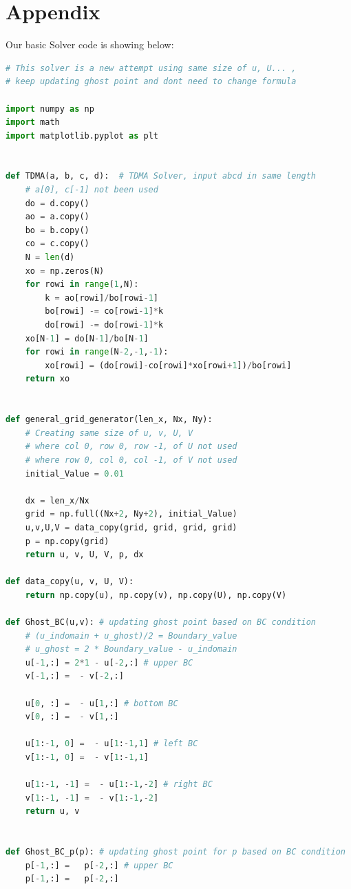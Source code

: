 \documentclass[12pt]{article}
\begin{document}
\section*{Appendix}
\begin{scriptsize}

Our basic Solver code is showing below:
\begin{lstlisting}[language=python,caption={Lid Driven Cavity Solver}]
# This solver is a new attempt using same size of u, U... , 
# keep updating ghost point and dont need to change formula

import numpy as np
import math
import matplotlib.pyplot as plt


def TDMA(a, b, c, d):  # TDMA Solver, input abcd in same length
    # a[0], c[-1] not been used
    do = d.copy()
    ao = a.copy()
    bo = b.copy()
    co = c.copy()
    N = len(d)
    xo = np.zeros(N)
    for rowi in range(1,N):
        k = ao[rowi]/bo[rowi-1]
        bo[rowi] -= co[rowi-1]*k
        do[rowi] -= do[rowi-1]*k
    xo[N-1] = do[N-1]/bo[N-1]
    for rowi in range(N-2,-1,-1):
        xo[rowi] = (do[rowi]-co[rowi]*xo[rowi+1])/bo[rowi]
    return xo


def general_grid_generator(len_x, Nx, Ny):
    # Creating same size of u, v, U, V
    # where col 0, row 0, row -1, of U not used
    # where row 0, col 0, col -1, of V not used
    initial_Value = 0.01

    dx = len_x/Nx
    grid = np.full((Nx+2, Ny+2), initial_Value)
    u,v,U,V = data_copy(grid, grid, grid, grid)
    p = np.copy(grid)
    return u, v, U, V, p, dx

def data_copy(u, v, U, V):
    return np.copy(u), np.copy(v), np.copy(U), np.copy(V)

def Ghost_BC(u,v): # updating ghost point based on BC condition
    # (u_indomain + u_ghost)/2 = Boundary_value
    # u_ghost = 2 * Boundary_value - u_indomain
    u[-1,:] = 2*1 - u[-2,:] # upper BC
    v[-1,:] =  - v[-2,:]

    u[0, :] =  - u[1,:] # bottom BC
    v[0, :] =  - v[1,:]

    u[1:-1, 0] =  - u[1:-1,1] # left BC
    v[1:-1, 0] =  - v[1:-1,1]

    u[1:-1, -1] =  - u[1:-1,-2] # right BC
    v[1:-1, -1] =  - v[1:-1,-2]
    return u, v


def Ghost_BC_p(p): # updating ghost point for p based on BC condition
    p[-1,:] =   p[-2,:] # upper BC
    p[-1,:] =   p[-2,:]


\end{lstlisting}
\end{scriptsize}
\end{document}
